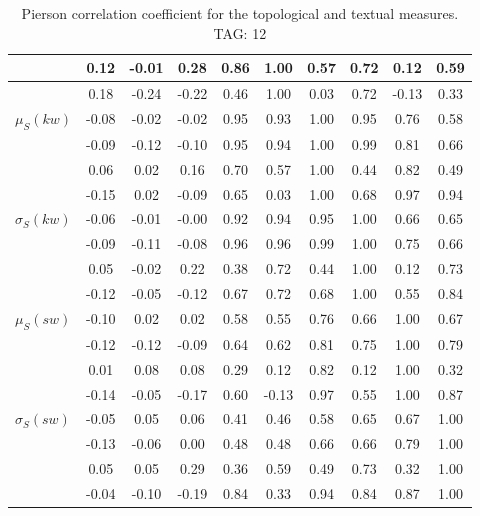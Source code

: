 \begin{table*}[h!]
\begin{center}
\begin{tabular}{| l | c | c | c | c | c | c | c | c | c |}
 & 0.12  & -0.01  & 0.28  & 0.86  & 1.00  & 0.57  & 0.72  & 0.12  & 0.59 \\\hline
 & 0.18  & -0.24  & -0.22  & 0.46  & 1.00  & 0.03  & 0.72  & -0.13  & 0.33 \\\hline
$\mu_S(kw)$ & -0.08  & -0.02  & -0.02  & 0.95  & 0.93  & 1.00  & 0.95  & 0.76  & 0.58 \\\hline
 & -0.09  & -0.12  & -0.10  & 0.95  & 0.94  & 1.00  & 0.99  & 0.81  & 0.66 \\\hline
 & 0.06  & 0.02  & 0.16  & 0.70  & 0.57  & 1.00  & 0.44  & 0.82  & 0.49 \\\hline
 & -0.15  & 0.02  & -0.09  & 0.65  & 0.03  & 1.00  & 0.68  & 0.97  & 0.94 \\\hline
$\sigma_S(kw)$ & -0.06  & -0.01  & -0.00  & 0.92  & 0.94  & 0.95  & 1.00  & 0.66  & 0.65 \\\hline
 & -0.09  & -0.11  & -0.08  & 0.96  & 0.96  & 0.99  & 1.00  & 0.75  & 0.66 \\\hline
 & 0.05  & -0.02  & 0.22  & 0.38  & 0.72  & 0.44  & 1.00  & 0.12  & 0.73 \\\hline
 & -0.12  & -0.05  & -0.12  & 0.67  & 0.72  & 0.68  & 1.00  & 0.55  & 0.84 \\\hline
$\mu_S(sw)$ & -0.10  & 0.02  & 0.02  & 0.58  & 0.55  & 0.76  & 0.66  & 1.00  & 0.67 \\\hline
 & -0.12  & -0.12  & -0.09  & 0.64  & 0.62  & 0.81  & 0.75  & 1.00  & 0.79 \\\hline
 & 0.01  & 0.08  & 0.08  & 0.29  & 0.12  & 0.82  & 0.12  & 1.00  & 0.32 \\\hline
 & -0.14  & -0.05  & -0.17  & 0.60  & -0.13  & 0.97  & 0.55  & 1.00  & 0.87 \\\hline
$\sigma_S(sw)$ & -0.05  & 0.05  & 0.06  & 0.41  & 0.46  & 0.58  & 0.65  & 0.67  & 1.00 \\\hline
 & -0.13  & -0.06  & 0.00  & 0.48  & 0.48  & 0.66  & 0.66  & 0.79  & 1.00 \\\hline
 & 0.05  & 0.05  & 0.29  & 0.36  & 0.59  & 0.49  & 0.73  & 0.32  & 1.00 \\\hline
 & -0.04  & -0.10  & -0.19  & 0.84  & 0.33  & 0.94  & 0.84  & 0.87  & 1.00 \\\hline
\end{tabular}
\caption{Pierson correlation coefficient for the topological and textual measures. TAG: 12}
\end{center}
\end{table*}